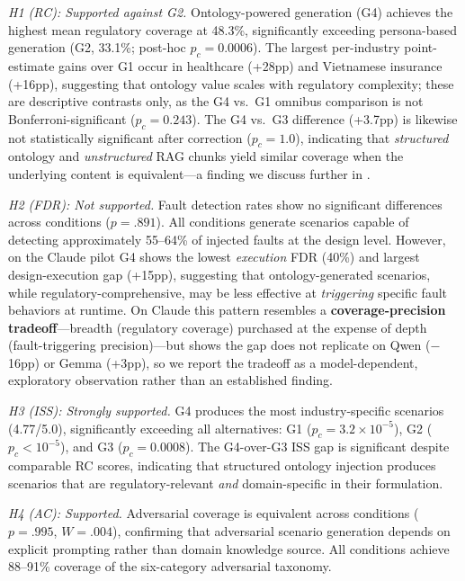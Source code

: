 \documentclass[11pt,a4paper]{article}
\begin{document}
\emph{H1 (RC): Supported against G2.} Ontology-powered generation (G4)
achieves the highest mean regulatory coverage at 48.3\%, significantly
exceeding persona-based generation (G2, 33.1\%; post-hoc $p_c = 0.0006$).
The largest per-industry point-estimate gains over G1 occur in healthcare
(+28pp) and Vietnamese insurance (+16pp), suggesting that ontology value
scales with regulatory complexity; these are descriptive contrasts only,
as the G4 vs.\ G1 omnibus comparison is not Bonferroni-significant
($p_c = 0.243$). The G4 vs.\ G3 difference (+3.7pp) is likewise not
statistically significant after correction ($p_c = 1.0$), indicating that
\emph{structured} ontology and \emph{unstructured} RAG chunks yield similar
coverage when the underlying content is equivalent---a finding we discuss
further in .

\emph{H2 (FDR): Not supported.} Fault detection rates show no
significant differences across conditions ($p = .891$). All conditions
generate scenarios capable of detecting approximately 55--64\% of
injected faults at the design level. However, on the Claude pilot G4
shows the lowest \emph{execution} FDR (40\%) and largest design-execution
gap (+15pp), suggesting that ontology-generated scenarios, while
regulatory-comprehensive, may be less effective at \emph{triggering}
specific fault behaviors at runtime. On Claude this pattern resembles a
\textbf{coverage-precision tradeoff}---breadth (regulatory coverage)
purchased at the expense of depth (fault-triggering precision)---but
 shows the gap does not replicate on Qwen
($-$16pp) or Gemma (+3pp), so we report the tradeoff as a
model-dependent, exploratory observation rather than an established finding.

\emph{H3 (ISS): Strongly supported.} G4 produces the most
industry-specific scenarios (4.77/5.0), significantly exceeding all
alternatives: G1 ($p_c = 3.2 \times 10^{-5}$), G2 ($p_c < 10^{-5}$),
and G3 ($p_c = 0.0008$). The G4-over-G3 ISS gap is significant
despite comparable RC scores, indicating that structured ontology
injection produces scenarios that are regulatory-relevant
\emph{and} domain-specific in their formulation.

\emph{H4 (AC): Supported.} Adversarial coverage is equivalent across
conditions ($p = .995$, $W = .004$), confirming that adversarial
scenario generation depends on explicit prompting rather than domain
knowledge source. All conditions achieve 88--91\% coverage of the
six-category adversarial taxonomy.
\end{document}
